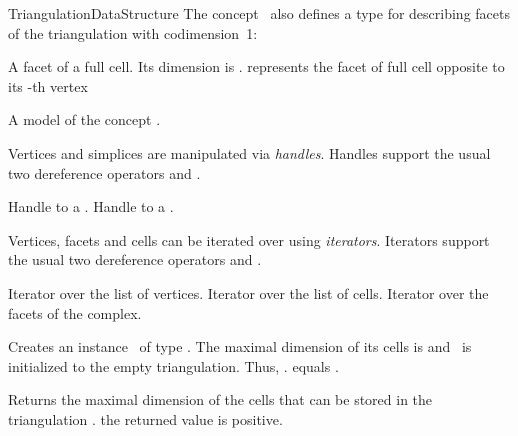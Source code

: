 \begin{ccRefConcept}{TriangulationDataStructure}
The concept \ccRefName\ also defines a type for describing facets of the
triangulation with codimension~1:

{A facet of a full cell. Its dimension is
.  represents the facet of
full cell  opposite to its -th vertex}

{A model of the concept .}

Vertices and simplices are manipulated via \emph{handles}. Handles support the
usual two dereference operators  and .

{
Handle to a .
}
\ccGlue
{}
{
Handle to a .
}

Vertices, facets and cells can be iterated over using \emph{iterators}.
Iterators support the usual two dereference operators  and
.

{
Iterator over the list of vertices.
}
\ccGlue
{}
{
Iterator over the list of cells.
}
\ccGlue
{}
{
Iterator over the facets of the complex.
}


\ccCreation
{}

 { Creates an instance \ccVar\ of
type \ccRefName. The maximal dimension of its cells is  and
\ccVar\ is initialized to the empty triangulation. Thus,
\ccVar. equals .}



 { Returns the maximal dimension of
the cells that can be stored in the triangulation \ccVar. \ccPostcond the
returned value is positive. }


\end{ccRefConcept}
